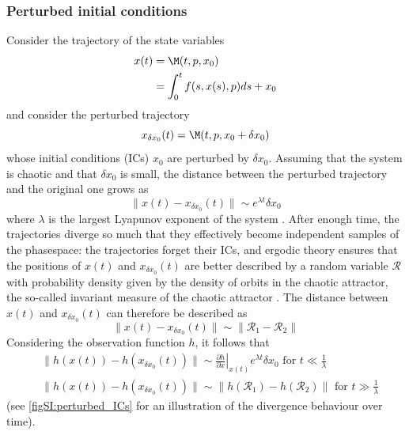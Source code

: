 \subsubsection{Perturbed initial conditions}
Consider the trajectory of the state variables
\begin{equation}
\begin{split}\label{eqSI:prob_statement}
        x(t) &= \M(t,p,x_0)\\
            &=\int_0^t f(s, x(s), p) ds + x_0
\end{split}
\end{equation}
and consider the perturbed trajectory 
\begin{equation}\label{eqSI:prob_statement2}
    x_{\delta x_0}(t) = \M(t, p, x_0 + \delta x_0)
\end{equation}
whose initial conditions (ICs) $x_0$ are perturbed by $\delta x_0$. Assuming that the system is chaotic and that $\delta x_0$ is small, the distance between the perturbed trajectory and the original one grows as
\begin{equation}
	\|x(t) - x_{\delta x_0}(t)\| \sim e^{\lambda t}\delta x_0
\end{equation}
where $\lambda$ is the largest Lyapunov exponent of the system \citep{strogatz2018nonlinear}.
% 
After enough time, the trajectories diverge so much that they effectively become independent samples of the phasespace: the trajectories forget their ICs, and ergodic theory ensures that the positions of $x(t)$ and $x_{\delta x_0}(t)$ are better described by a random variable $\mathcal R$ with probability density given by the density of orbits in the chaotic attractor, the so-called invariant measure of the chaotic attractor \citep{jost2005dynamical}.
% 
The distance between $x(t)$ and $x_{\delta {x_0}}(t)$ can therefore be described as 
\begin{equation}
	\|x(t) - x_{\delta x_0}(t)\| \sim \|\mathcal{R}_1 - \mathcal{R}_2 \|
\end{equation}
%
Considering the observation function $h$, it follows that
\begin{equation}\label{eqSI:divergenceTrajectoriesICs}
\begin{aligned}
	&\|h(x(t)) - h(x_{\delta x_0}(t))\| \sim \left.\frac{\partial h}{\partial x}\right|_{x(t)} e^{\lambda t}\delta x_0 \text{    for }t\ll \frac{1}{\lambda}\\
	&\|h(x(t)) - h(x_{\delta x_0}(t))\| \sim \|h\left(\mathcal{R}_1\right) - h\left(\mathcal{R}_2\right) \| \text{    for }t\gg \frac{1}{\lambda}
\end{aligned}
\end{equation}
(see \cref{figSI:perturbed_ICs} for an illustration of the divergence behaviour over time).


